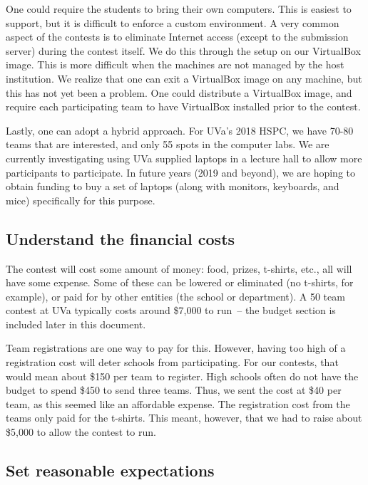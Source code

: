 \documentclass[11pt,twoside,letterpaper]{book}
\begin{document}
One could require the students to bring their own computers.  This is
easiest to support, but it is difficult to enforce a custom
environment.  A very common aspect of the contests is to eliminate
Internet access (except to the submission server) during the contest
itself.  We do this through the setup on our VirtualBox image.  This
is more difficult when the machines are not managed by the host
institution.  We realize that one can exit a VirtualBox image on any
machine, but this has not yet been a problem.  One could distribute a
VirtualBox image, and require each participating team to have
VirtualBox installed prior to the contest.

Lastly, one can adopt a hybrid approach.  For UVa's 2018 HSPC, we have
70-80 teams that are interested, and only 55 spots in the computer
labs.  We are currently investigating using UVa supplied laptops in a
lecture hall to allow more participants to participate.  In future
years (2019 and beyond), we are hoping to obtain funding to buy a set
of laptops (along with monitors, keyboards, and mice) specifically for
this purpose.


\subsection*{Understand the financial costs}

The contest will cost some amount of money: food, prizes, t-shirts,
etc., all will have some expense.  Some of these can be lowered or
eliminated (no t-shirts, for example), or paid for by other entities
(the school or department).  A 50 team contest at UVa typically costs
around \$7,000 to run~-- the budget section is included later in this
document.

Team registrations are one way to pay for this.  However, having too
high of a registration cost will deter schools from participating.
For our contests, that would mean about \$150 per team to register.
High schools often do not have the budget to spend \$450 to send three
teams.  Thus, we sent the cost at \$40 per team, as this seemed like
an affordable expense.  The registration cost from the teams only paid
for the t-shirts.  This meant, however, that we had to raise about
\$5,000 to allow the contest to run.


\subsection*{Set reasonable expectations}
\end{document}
